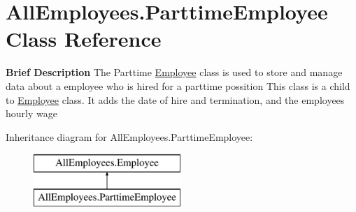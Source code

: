\hypertarget{class_all_employees_1_1_parttime_employee}{}\section{All\+Employees.\+Parttime\+Employee Class Reference}
\label{class_all_employees_1_1_parttime_employee}


{\bfseries Brief Description} The Parttime \hyperlink{class_all_employees_1_1_employee}{Employee} class is used to store and manage data about a employee who is hired for a parttime possition This class is a child to \hyperlink{class_all_employees_1_1_employee}{Employee} class. It adds the date of hire and termination, and the employees hourly wage  


Inheritance diagram for All\+Employees.\+Parttime\+Employee\+:\begin{figure}[H]
\begin{center}
\leavevmode
\includegraphics[height=2.000000cm]{class_all_employees_1_1_parttime_employee}
\end{center}
\end{figure}
